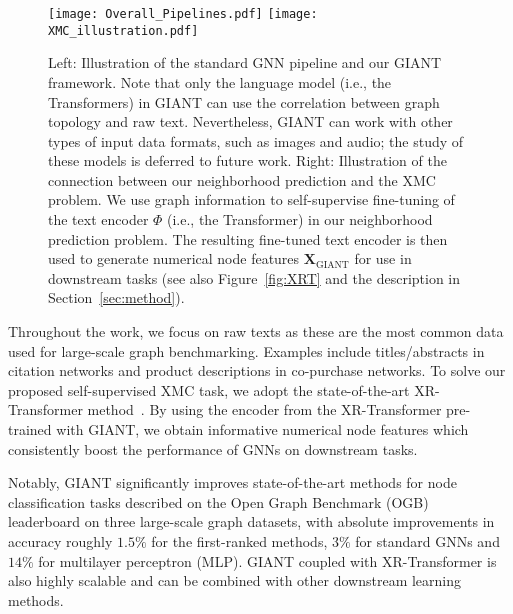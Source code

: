 \documentclass{article} %
\begin{document}
\begin{figure}[t]
    \centering
    \texttt{[image: Overall\_Pipelines.pdf]}
    \texttt{[image: XMC\_illustration.pdf]}
    \vspace{-0.5cm}
    \caption{Left: Illustration of the standard GNN pipeline and our GIANT framework. Note that only the language model (i.e., the Transformers) in GIANT can use the correlation between graph topology and raw text. Nevertheless, GIANT can work with other types of input data formats, such as images and audio; the study of these models is deferred to future work. Right: Illustration of the connection between our neighborhood prediction and the XMC problem. We use graph information to self-supervise fine-tuning of the text encoder $\Phi$ (i.e., the Transformer) in our neighborhood prediction problem. The resulting fine-tuned text encoder is then used to generate numerical node features $\mathbf{X}_{\text{GIANT}}$ for use in downstream tasks (see also Figure~\ref{fig:XRT} and the description in Section~\ref{sec:method}).}
    \label{fig:pipelines}
    \vspace{-0.3in}
\end{figure}

Throughout the work, we focus on raw texts as these are the most common data used for large-scale graph benchmarking. %
Examples include titles/abstracts in citation networks and product descriptions in co-purchase networks. To solve our proposed self-supervised XMC task, we adopt the state-of-the-art XR-Transformer method~\citep{jiong2021fast}. By using the encoder from the XR-Transformer pre-trained with GIANT, we obtain informative numerical node features which consistently boost the performance of GNNs on downstream tasks. 

Notably, GIANT significantly improves state-of-the-art methods for node classification tasks described on the Open Graph Benchmark (OGB)~\citep{hu2020open} leaderboard on three large-scale graph datasets, with absolute improvements in accuracy roughly $1.5\%$ for the first-ranked methods, $3\%$ for standard GNNs and $14\%$ for multilayer perceptron (MLP). GIANT coupled with XR-Transformer is also highly scalable and can be combined with other downstream learning methods.
\end{document}
